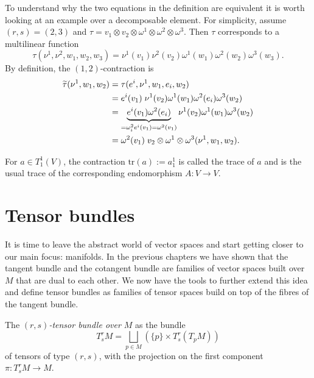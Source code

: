 \begin{example}
  To understand why the two equations in the definition are equivalent it is worth looking at an example over a decomposable element.
  For simplicity, assume $(r,s) = (2,3)$ and $\tau = v_1\otimes v_2\otimes\omega^1\otimes\omega^2\otimes\omega^3$.
  Then $\tau$ corresponds to a multilinear function
  \begin{equation}
    \tau(\nu^1,\nu^2,w_1,w_2,w_3) = \nu^1(v_1)\nu^2(v_2)\omega^1(w_1)\omega^2(w_2)\omega^3(w_3).
  \end{equation}
  By definition, the $(1,2)$-contraction is
  \begin{align}
    \widetilde\tau(\nu^1,w_1,w_2) &= \tau(e^i,\nu^1,w_1,e_i,w_2) \\
    &= e^i(v_1)\;\nu^1(v_2)\omega^1(w_1)\omega^2(e_i)\omega^3(w_2) \\
    &= \LaTeXunderbrace{e^i(v_1)\omega^2(e_i)}_{=\omega^2_i e^i (v_1) =\omega^2(v_1)}\nu^1(v_2)\omega^1(w_1)\omega^3(w_2) \\
    &= \omega^2(v_1)\; v_2\otimes\omega^1\otimes\omega^3 (\nu^1,w_1,w_2).
  \end{align}
\end{example}

\begin{example}
  For $a\in T_1^1(V)$, the contraction $\mathrm{tr} (a) := a^1_1$ is called the trace of $a$ and is the usual trace of the corresponding endomorphism $A:V\to V$.
\end{example}

\section{Tensor bundles}

It is time to leave the abstract world of vector spaces and start getting closer to our main focus: manifolds.
In the previous chapters we have shown that the tangent bundle and the cotangent bundle are families of vector spaces built over $M$ that are dual to each other.
We now have the tools to further extend this idea and define tensor bundles as families of tensor spaces build on top of the fibres of the tangent bundle.

\begin{definition}
  The \emph{$(r,s)$-tensor bundle over $M$} as the bundle
  \begin{equation}
    T_s^r M = \bigsqcup_{p\in M}\left(\{p\}\times T_s^r(T_p M)\right)
  \end{equation}
  of tensors of type $(r,s)$, with the projection on the first component $\pi:T_s^r M\to M$.
\end{definition}

